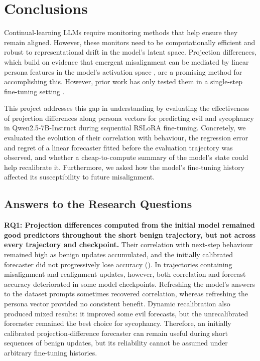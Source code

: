 \chapter{Conclusions}
\label{ch:conclusions}

Continual-learning LLMs require monitoring methods that help ensure they remain aligned. However, these monitors need to be computationally efficient and robust to representational drift in the model's latent space. Projection differences, which build on evidence that emergent misalignment can be mediated by linear persona features in the model's activation space \citep{wang2026persona_em_openai}, are a promising method for accomplishing this. However, prior work has only tested them in a single-step fine-tuning setting \citep{chen2025persona_vectors}.

This project addresses this gap in understanding by evaluating the effectiveness of projection differences along persona vectors for predicting evil and sycophancy in Qwen2.5-7B-Instruct during sequential RSLoRA fine-tuning. Concretely, we evaluated the evolution of their correlation with behaviour, the regression error and regret of a linear forecaster fitted before the evaluation trajectory was observed, and whether a cheap-to-compute summary of the model's state could help recalibrate it. Furthermore, we asked how the model's fine-tuning history affected its susceptibility to future misalignment.

\section{Answers to the Research Questions}


\textbf{RQ1: Projection differences computed from the initial model remained good predictors throughout the short benign trajectory, but not across every trajectory and checkpoint.} Their correlation with next-step behaviour remained high as benign updates accumulated, and the initially calibrated forecaster did not progressively lose accuracy (). In trajectories containing misalignment and realignment updates, however, both correlation and forecast accuracy deteriorated in some model checkpoints. Refreshing the model's answers to the dataset prompts sometimes recovered correlation, whereas refreshing the persona vector provided no consistent benefit. Dynamic recalibration also produced mixed results: it improved some evil forecasts, but the unrecalibrated forecaster remained the best choice for sycophancy. Therefore, an initially calibrated projection-difference forecaster can remain useful during short sequences of benign updates, but its reliability cannot be assumed under arbitrary fine-tuning histories.


